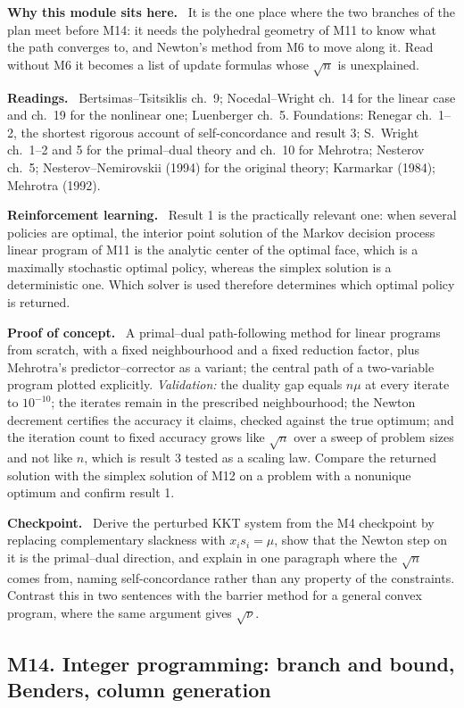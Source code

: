 \documentclass[11pt,a4paper]{article}
\newcommand{\mpart}[1]{\smallskip\noindent\textbf{#1}\ \ignorespaces}
\begin{document}
\mpart{Why this module sits here.} It is the one place where the two branches of the plan
meet before M14: it needs the polyhedral geometry of M11 to know what the path converges to,
and Newton's method from M6 to move along it. Read without M6 it becomes a list of update
formulas whose $\sqrt n$ is unexplained.

\mpart{Readings.} Bertsimas--Tsitsiklis ch.~9; Nocedal--Wright ch.~14 for the linear case and
ch.~19 for the nonlinear one; Luenberger ch.~5. Foundations: Renegar ch.~1--2, the shortest
rigorous account of self-concordance and result 3; S.~Wright ch.~1--2 and 5 for the
primal--dual theory and ch.~10 for Mehrotra; Nesterov ch.~5; Nesterov--Nemirovskii (1994) for
the original theory; Karmarkar (1984); Mehrotra (1992).

\mpart{Reinforcement learning.} Result 1 is the practically relevant one: when several policies
are optimal, the interior point solution of the Markov decision process linear program of M11
is the analytic center of the optimal face, which is a maximally stochastic optimal policy,
whereas the simplex solution is a deterministic one. Which solver is used therefore determines
which optimal policy is returned.

\mpart{Proof of concept.} A primal--dual path-following method for linear programs from
scratch, with a fixed neighbourhood and a fixed reduction factor, plus Mehrotra's
predictor--corrector as a variant; the central path of a two-variable program plotted
explicitly. \emph{Validation:} the duality gap equals $n\mu$ at every iterate to $10^{-10}$;
the iterates remain in the prescribed neighbourhood; the Newton decrement certifies the
accuracy it claims, checked against the true optimum; and the iteration count to fixed accuracy
grows like $\sqrt n$ over a sweep of problem sizes and not like $n$, which is result 3 tested
as a scaling law. Compare the returned solution with the simplex solution of M12 on a problem
with a nonunique optimum and confirm result 1.

\mpart{Checkpoint.} Derive the perturbed KKT system from the M4 checkpoint by replacing
complementary slackness with $x_is_i=\mu$, show that the Newton step on it is the primal--dual
direction, and explain in one paragraph where the $\sqrt n$ comes from, naming
self-concordance rather than any property of the constraints. Contrast this in two sentences
with the barrier method for a general convex program, where the same argument gives $\sqrt\nu$.

\subsection{M14. Integer programming: branch and bound, Benders, column generation}
\end{document}
